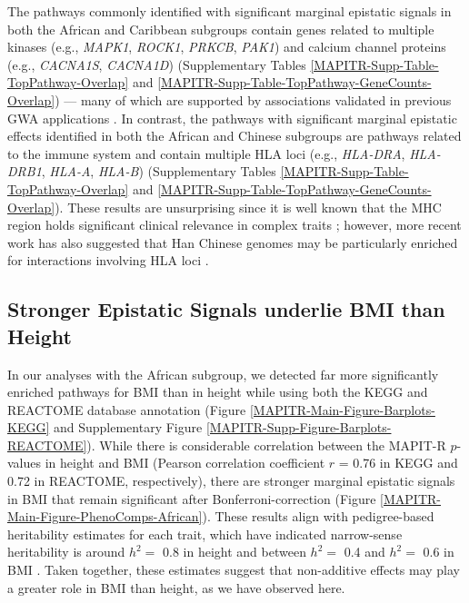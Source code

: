 \documentclass[10pt]{article}
\begin{document}
The pathways commonly identified with significant marginal epistatic signals in both the African and Caribbean subgroups contain genes related to multiple kinases (e.g., \textit{MAPK1}, \textit{ROCK1}, \textit{PRKCB}, \textit{PAK1}) and calcium channel proteins (e.g., \textit{CACNA1S}, \textit{CACNA1D}) (Supplementary Tables \ref{MAPITR-Supp-Table-TopPathway-Overlap} and \ref{MAPITR-Supp-Table-TopPathway-GeneCounts-Overlap}) --- many of which are supported by associations validated in previous GWA applications \cite{Cousminer2013,Wood2014a}. In contrast, the pathways with significant marginal epistatic effects identified in both the African and Chinese subgroups are pathways related to the immune system and contain multiple HLA loci (e.g., \textit{HLA-DRA}, \textit{HLA-DRB1}, \textit{HLA-A}, \textit{HLA-B}) (Supplementary Tables \ref{MAPITR-Supp-Table-TopPathway-Overlap} and \ref{MAPITR-Supp-Table-TopPathway-GeneCounts-Overlap}). These results are unsurprising since it is well known that the MHC region holds significant clinical relevance in complex traits \cite{Wan2010,Rose2012,Stahl2012,Crawford2018b}; however, more recent work has also suggested that Han Chinese genomes may be particularly enriched for interactions involving HLA loci \cite{Deng2020}. 

\subsection*{Stronger Epistatic Signals underlie BMI than Height}

In our analyses with the African subgroup, we detected far more significantly enriched pathways for BMI than in height while using both the KEGG and REACTOME database annotation (Figure \ref{MAPITR-Main-Figure-Barplots-KEGG} and Supplementary Figure \ref{MAPITR-Supp-Figure-Barplots-REACTOME}). While there is considerable correlation between the MAPIT-R $p$-values in height and BMI (Pearson correlation coefficient $r$ = 0.76 in KEGG and 0.72 in REACTOME, respectively), there are stronger marginal epistatic signals in BMI that remain significant after Bonferroni-correction (Figure \ref{MAPITR-Main-Figure-PhenoComps-African}). These results align with pedigree-based heritability estimates for each trait, which have indicated narrow-sense heritability is around $h^2 =$ 0.8 in height and between $h^2 =$ 0.4 and $h^2 =$ 0.6 in BMI \cite{Elks2012,Visscher2012}. Taken together, these estimates suggest that non-additive effects may play a greater role in BMI than height, as we have observed here.
\end{document}
